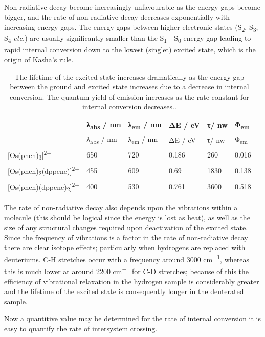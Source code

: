 \documentclass[
]{book}
\begin{document}
Non radiative decay become increasingly unfavourable as the energy gaps become bigger, and the rate of non-radiative decay decreases exponentially with increasing energy gaps. The energy gaps between higher electronic states (S\textsubscript{2}, S\textsubscript{3}, S\textsubscript{4} \emph{etc.}) are usually significantly smaller than the S\textsubscript{1} - S\textsubscript{0} energy gap leading to rapid internal conversion down to the lowest (singlet) excited state, which is the origin of Kasha's rule.

\begin{longtable}[]{@{}llllll@{}}
\caption{\label{tab:actinometer} The lifetime of the excited state increases dramatically as the energy gap between the ground and excited state increases due to a decrease in internal conversion. The quantum yield of emission increases as the rate constant for internal conversion decreases..}\tabularnewline
\toprule
& λ\textsubscript{abs} / nm & λ\textsubscript{em} / nm & ΔE / eV & τ/ nw & Φ\textsubscript{em} \\
\midrule
\endfirsthead
\toprule
& λ\textsubscript{abs} / nm & λ\textsubscript{em} / nm & ΔE / eV & τ/ nw & Φ\textsubscript{em} \\
\midrule
\endhead
{[}Os(phen)\textsubscript{3}{]}\textsuperscript{2+} & 650 & 720 & 0.186 & 260 & 0.016 \\
{[}Os(phen)\textsubscript{2}(dppene){]}\textsuperscript{2+} & 455 & 609 & 0.69 & 1830 & 0.138 \\
{[}Os(phen)(dppene)\textsubscript{2}{]}\textsuperscript{2+} & 400 & 530 & 0.761 & 3600 & 0.518 \\
\bottomrule
\end{longtable}

The rate of non-radiative decay also depends upon the vibrations within a molecule (this should be logical since the energy is lost as heat), as well as the size of any structural changes required upon deactivation of the excited state. Since the frequency of vibrations is a factor in the rate of non-radiative decay there are clear isotope effects; particularly when hydrogens are replaced with deuteriums. C-H stretches occur with a frequency around 3000 cm\textsuperscript{−1}, whereas this is much lower at around 2200 cm\textsuperscript{−1} for C-D stretches; because of this the efficiency of vibrational relaxation in the hydrogen sample is considerably greater and the lifetime of the excited state is consequently longer in the deuterated sample.

Now a quantitive value may be determined for the rate of internal conversion it is easy to quantify the rate of intersystem crossing.
\end{document}
